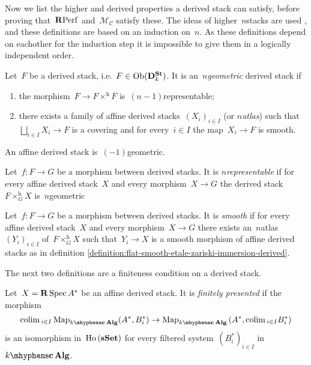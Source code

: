 \begin{refsection}
Now we list the higher and derived properties a derived stack can satisfy, before proving that~$\mathbf{R}\mathrm{Perf}$ and~$\mathcal{M}_{\mathcal{C}}$ satisfy these. The ideas of higher~$n$\dash stacks are used \cite{simpson}, and these definitions are based on an induction on~$n$. As these definitions depend on eachother for the induction step it is impossible to give them in a logically independent order.
\begin{definition}
  Let~$F$ be a derived stack, i.e.\ $F\in\operatorname{Ob}(\mathbf{D}^\mathbf{St}_k)$. It is an~\emph{$n$\dash geometric} derived stack if
  \begin{enumerate}
    \item the morphism~$F\to F\times^{\mathrm{h}}F$ is~$(n-1)$\dash representable;
    \item there exists a family of affine derived stacks~$(X_i)_{i\in I}$ (or \emph{$n$\dash atlas}) such that~$\bigsqcup_{i\in I}X_i\to F$ is a covering and for every~$i\in I$ the map~$X_i\to F$ is smooth.
  \end{enumerate}
  An affine derived stack is~$(-1)$\dash geometric.
\end{definition}
\begin{definition}
  Let~$f\colon F\to G$ be a morphism between derived stacks. It is \emph{$n$\dash representable} if for every affine derived stack~$X$ and every morphism~$X\to G$ the derived stack~$F\times_G^{\mathrm{h}}X$ is~$n$\dash geometric
\end{definition}
\begin{definition}
  Let~$f\colon F\to G$ be a morphism between derived stacks. It is \emph{smooth} if for every affine derived stack~$X$ and every morphism~$X\to G$ there exists an~$n$\dash atlas~$(Y_i)_{i\in I}$ of~$F\times_G^{\mathrm{h}}X$ such that~$Y_i\to X$ is a smooth morphism of affine derived stacks as in definition \ref{definition:flat-smooth-etale-zariski-immersion-derived}.
\end{definition}
The next two definitions are a finiteness condition on a derived stack.
\begin{definition}
  Let~$X=\mathbf{R}\operatorname{Spec} A^*$ be an affine derived stack. It is \emph{finitely presented} if the morphism
  \begin{equation}
    \colim_{i\in I}\Map_{\scAlg{k}}(A^*,B_i^*)\to\Map_{\scAlg{k}}\left( A^*,\colim_{i\in I}B_i^* \right)
  \end{equation}
  is an isomorphism in~$\operatorname{\mathrm{Ho} \,}(\mathbf{s\,\!\mathbf{Set}})$ for every filtered system~$(B_i^*)_{i\in I}$ in~$\scAlg{k}$.
\end{definition}

\end{refsection}
